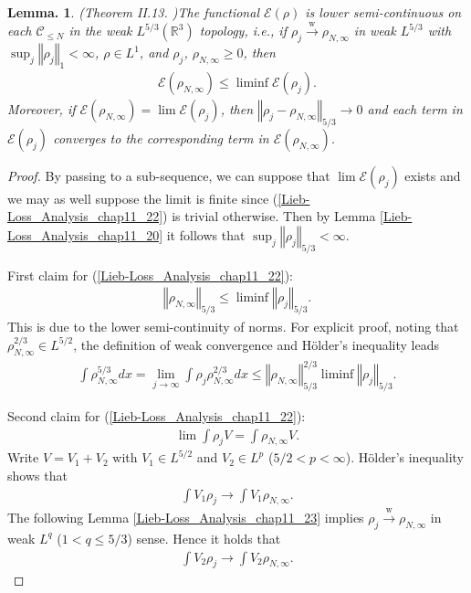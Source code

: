 \documentclass[openany, a4paper, oneside]{jsbook}
\theoremstyle{break}
\newtheorem{lem}[thm]{Lemma.}
\theoremstyle{breakdefn}
\newcommand{\norm}[1]{\left\Vert#1\right\Vert}
\newcommand{\bbRthree}{\mathbb{R}^3}
\newcommand{\calC}{\mathcal{C}}
\newcommand{\calE}{\mathcal{E}}
\newcommand{\limjtoinfty}{\lim_{j \to \infty}}
\newcommand{\rhoNinfty}{\rho_{N, \infty}}
\newcommand{\wto}{\xrightarrow{\text{w}}}
\begin{document}
\begin{lem}\textup{(Theorem II.13. \cite{LiebSimon1})}\label{Lieb-Loss_Analysis_chap11_24}
 The functional $\calE (\rho)$ is lower semi-continuous on each $\calC_{\leq N}$ in the weak $L^{5/3} (\bbRthree)$ topology, i.e.,
 if $\rho_j \wto \rhoNinfty$ in weak $L^{5/3}$ with $\sup_j \norm{\rho_j}_1 < \infty$, $\rho \in L^1$, and $\rho_j$, $\rhoNinfty \geq 0$,
 then
 \begin{align}
  \calE (\rhoNinfty)
  \leq
  \liminf \calE (\rho_j). \label{Lieb-Loss_Analysis_chap11_22}
 \end{align}
 Moreover, if $\calE (\rhoNinfty) = \lim \calE (\rho_j)$, then $\norm{\rho_j - \rhoNinfty}_{5/3} \to 0$ and
 each term in $\calE (\rho_j)$ converges to the corresponding term in $\calE (\rhoNinfty)$.
\end{lem}
\begin{proof}
By passing to a sub-sequence, we can suppose that $\lim \calE (\rho_j)$ exists and we may as well suppose the limit is finite
since (\ref{Lieb-Loss_Analysis_chap11_22}) is trivial otherwise.
Then by Lemma \ref{Lieb-Loss_Analysis_chap11_20} it follows that $\sup_j \norm{\rho_j}_{5/3} < \infty$.

First claim for (\ref{Lieb-Loss_Analysis_chap11_22}):
\begin{align}
 \norm{\rhoNinfty}_{5/3}
 \leq
 \liminf \norm{\rho_j}_{5/3}.
\end{align}
This is due to the lower semi-continuity of norms.
For explicit proof, noting that $\rhoNinfty^{2/3} \in L^{5/2}$, the definition of weak convergence and H\"older's inequality leads
\begin{align}
 \int \rhoNinfty^{5/3} dx
 =
 \limjtoinfty \int \rho_j \rhoNinfty^{2/3} dx
 \leq
 \norm{\rhoNinfty}_{5/3}^{2/3} \liminf \norm{\rho_j}_{5/3}.
\end{align}

Second claim for (\ref{Lieb-Loss_Analysis_chap11_22}):
\begin{align}
 \lim \int \rho_j V
 =
 \int \rhoNinfty V.
\end{align}
Write $V = V_1 + V_2$ with $V_1 \in L^{5/2}$ and $V_2 \in L^p$ ($5/2 < p < \infty$).
H\"older's inequality shows that
\begin{align}
 \int V_1 \rho_j \to \int V_1 \rhoNinfty.
\end{align}
The following Lemma \ref{Lieb-Loss_Analysis_chap11_23} implies $\rho_j \wto \rhoNinfty$ in weak $L^q$ ($1 < q \leq 5/3$) sense.
Hence it holds that
\begin{align}
 \int V_2 \rho_j \to \int V_2 \rhoNinfty.
\end{align}


\end{proof}
\end{document}
